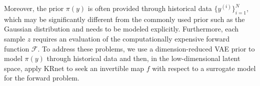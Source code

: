 Moreover, the prior $\pi(y)$ is often provided through historical data $\{y^{(i)}\}_{i=1}^N$, which may be significantly different from the commonly used prior such as the Gaussian distribution and needs to be modeled explicitly. Furthermore, 
each sample $z$ requires an evaluation of the computationally expensive forward function $\mathcal{F}$. 
To address these problems, we use a dimension-reduced VAE prior to model $\pi(y)$ through  historical data and then, in the low-dimensional latent space, apply KRnet to seek an invertible map $f$ with respect to a surrogate model for the forward problem.